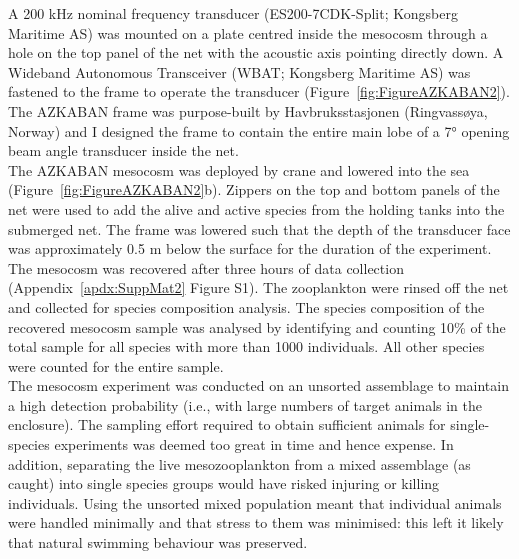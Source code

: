 A 200 kHz nominal frequency transducer (ES200-7CDK-Split; Kongsberg Maritime AS) was mounted on a plate centred inside the mesocosm through a hole on the top panel of the net with the acoustic axis pointing directly down. A Wideband Autonomous Transceiver (WBAT; Kongsberg Maritime AS) was fastened to the frame to operate the transducer (Figure~\ref{fig:FigureAZKABAN2}). The AZKABAN frame was purpose-built by Havbruksstasjonen (Ringvassøya, Norway) and I designed the frame to contain the entire main lobe of a 7° opening beam angle transducer inside the net.\\
The AZKABAN mesocosm was deployed by crane and lowered into the sea (Figure~\ref{fig:FigureAZKABAN2}b). Zippers on the top and bottom panels of the net were used to add the alive and active species from the holding tanks into the submerged net. The frame was lowered such that the depth of the transducer face was approximately 0.5 m below the surface for the duration of the experiment. The mesocosm was recovered after three hours of data collection (Appendix~\ref{apdx:SuppMat2} Figure S1). The zooplankton were rinsed off the net and collected for species composition analysis. The species composition of the recovered mesocosm sample was analysed by identifying and counting 10\% of the total sample for all species with more than 1000 individuals. All other species were counted for the entire sample.\\
The mesocosm experiment was conducted on an unsorted assemblage to maintain a high detection probability (i.e., with large numbers of target animals in the enclosure). The sampling effort required to obtain sufficient animals for single-species experiments was deemed too great in time and hence expense. In addition, separating the live mesozooplankton from a mixed assemblage (as caught) into single species groups would have risked injuring or killing individuals. Using the unsorted mixed population meant that individual animals were handled minimally and that stress to them was minimised: this left it likely that natural swimming behaviour was preserved.

